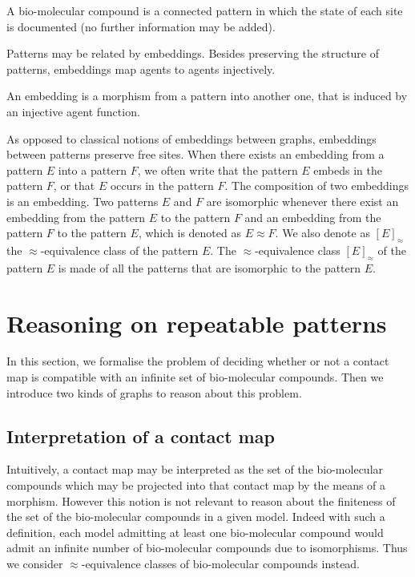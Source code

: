 \documentclass{entcs}
\newcommand{\iso}{\approx}
\begin{document}
A bio-molecular compound is a connected pattern in which the state of each site is documented (no further information may be added).

Patterns may be related by embeddings. Besides preserving the structure of patterns, embeddings map agents to agents injectively.

\begin{defn}[embeddings]
  An embedding is a morphism from a pattern into another one, that is induced by an injective agent function.
\end{defn}

As opposed to classical notions of embeddings between graphs, embeddings between patterns preserve free sites.
When there exists an embedding from a pattern $E$ into a pattern $F$, we often write that the pattern $E$ embeds in the pattern $F$, or that $E$ occurs in the pattern $F$. The composition of two embeddings is an embedding. Two patterns $E$ and $F$ are isomorphic whenever there exist an embedding from the pattern $E$ to the pattern $F$ and an embedding from the pattern $F$ to the pattern $E$, which is denoted as $E \iso F$.  We also denote as $[E]_{\iso}$ the $\iso$-equivalence class of the pattern $E$. The $\iso$-equivalence class $[E]_{\iso}$ of the pattern $E$ is made of all the patterns that are isomorphic to the pattern $E$.

\section{Reasoning on repeatable patterns}
\label{sec:graphs}

In this section, we formalise the problem of deciding whether or not a contact map is compatible with an infinite set of bio-molecular compounds. Then we introduce two kinds of graphs to reason about this problem.

\subsection{Interpretation of a contact map}

Intuitively, a contact map may be interpreted as the set of the bio-molecular compounds which may be projected into that contact map by the means of a morphism. However this notion is not relevant to reason about the finiteness of the set of the bio-molecular compounds in  a given model. Indeed with such a  definition,  each model admitting at least one bio-molecular compound would admit an infinite number of bio-molecular compounds due to isomorphisms. Thus we consider $\iso$-equivalence classes of bio-molecular compounds instead.
\end{document}
